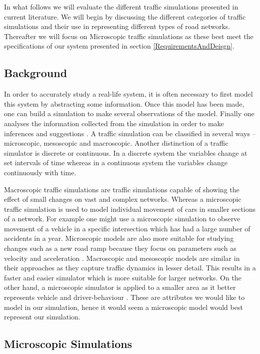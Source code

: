 \documentclass{article}
\begin{document}
	\noindent
	In what follows we will evaluate the different traffic simulations presented in current literature. 
	We will begin by discussing the different categories of traffic simulations and their use in representing different types of road networks. 
	Thereafter we will focus on Microscopic traffic simulations as these best meet the specifications of our system presented in section \ref{RequirementsAndDeisgn}.
	
	\subsection{Background}
	
	In order to accurately study a real-life system, it is often necessary to first model this system by abstracting some information. 
	Once this model has been made, one can build a simulation to make several observations of the model. 
	Finally one analyses the information collected from the simulation in order to make inferences and suggestions \cite{sokolowski2011principles}. 
	A traffic simulation can be classified in several ways -- microscopic, mesoscopic and macroscopic. 
	Another distinction of a traffic simulator is discrete or continuous. 
	In a discrete system the variables change at set intervals of time whereas in a continuous system the variables change continuously with time. 
	
	Macroscopic traffic simulations are traffic simulations capable of showing the effect of small changes on vast and complex networks. 
	Whereas a microscopic traffic simulation is used to model individual movement of cars  in smaller sections of a network. 
	For example one might use a microscopic simulation to observe movement of a vehicle in a specific intersection which has had a large number of accidents in a year. 
	Microscopic models are also more suitable for studying changes such as a new road ramp because they focus on parameters such as velocity and acceleration \cite{sokolowski2011principles}. 
	Macroscopic and mesoscopic models are similar in their approaches as they capture traffic dynamics in lesser detail. 
	This results in a faster and easier simulator which is more suitable for larger networks. 
	On the other hand, a microscopic simulator is applied to a smaller area as it better represents vehicle and driver-behaviour \cite{burghout2005hybrid}. 
	These are attributes we would like to model in our simulation, hence it would seem a microscopic model would best represent our simulation. 
	
	
	\subsection{Microscopic Simulations}\label{LiteratureReview}
	
\end{document}
